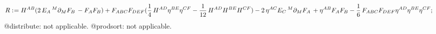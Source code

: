 \documentclass[11pt]{article}
\def\specialcolon{\mathrel{\mathop{:}}\hspace{-.5em}}
\begin{document}
\begin{dmath*}[compact, spread=2pt]
R\specialcolon{}= {H}^{A B} (2\, {E}_{A}\,^{M} {\partial}_{M}{{F}_{B}}\,  - {F}_{A} {F}_{B}) + {F}_{A B C} {F}_{D E F} (\frac{1}{4}\, {H}^{A D} {\eta}^{B E} {\eta}^{C F} - \frac{1}{12}\, {H}^{A D} {H}^{B E} {H}^{C F}) - 2\, {\eta}^{A C} {E}_{C}\,^{M} {\partial}_{M}{{F}_{A}}\,  + {\eta}^{A B} {F}_{A} {F}_{B} - \frac{1}{6}\, {F}_{A B C} {F}_{D E F} {\eta}^{A D} {\eta}^{B E} {\eta}^{C F};
\end{dmath*}
@distribute: not applicable.
@prodsort: not applicable.
\end{document}
